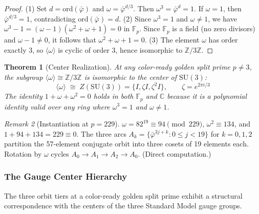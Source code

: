 \documentclass[12pt,oneside]{article}
\theoremstyle{principia}
\newtheorem{theorem}{Theorem}[section]
\theoremstyle{definition}
\theoremstyle{remark}
\newtheorem{remark}[theorem]{Remark}
\providecommand{\CC}{\mathbb{C}}
\providecommand{\ZZ}{\mathbb{Z}}
\providecommand{\FF}{\mathbb{F}}
\providecommand{\vpbar}{\bar{\varphi}}
\begin{document}
\begin{proof}
(1) Set $d = \mathrm{ord}(\vpbar)$ and $\omega = \vpbar^{d/3}$. Then $\omega^3 = \vpbar^d = 1$. If $\omega = 1$, then $\vpbar^{d/3} = 1$, contradicting $\mathrm{ord}(\vpbar) = d$. (2) Since $\omega^3 = 1$ and $\omega \neq 1$, we have $\omega^3 - 1 = (\omega - 1)(\omega^2 + \omega + 1) = 0$ in $\FF_p$. Since $\FF_p$ is a field (no zero divisors) and $\omega - 1 \neq 0$, it follows that $\omega^2 + \omega + 1 = 0$. (3) The element $\omega$ has order exactly 3, so $\langle\omega\rangle$ is cyclic of order 3, hence isomorphic to $\ZZ/3\ZZ$. \qedhere
\end{proof}

\begin{theorem}[Center Realization]\label{thm:center}
At any color-ready golden split prime $p \neq 3$, the subgroup $\langle\omega\rangle \cong \ZZ/3\ZZ$ is isomorphic to the center of $\mathrm{SU}(3)$:
$$\langle\omega\rangle \;\cong\; Z(\mathrm{SU}(3)) = \{I, \zeta I, \zeta^2 I\}, \qquad \zeta = e^{2\pi i/3}$$
The identity $1 + \omega + \omega^2 = 0$ holds in both $\FF_p$ and $\CC$ because it is a polynomial identity valid over any ring where $\omega^3 = 1$ and $\omega \neq 1$.
\end{theorem}

\begin{remark}[Instantiation at $p = 229$]
$\omega = 82^{19} \equiv 94 \pmod{229}$, $\omega^2 \equiv 134$, and $1 + 94 + 134 = 229 \equiv 0$. The three arcs $A_k = \{\vpbar^{3j+k} : 0 \leq j < 19\}$ for $k = 0, 1, 2$ partition the 57-element conjugate orbit into three cosets of 19 elements each. Rotation by $\omega$ cycles $A_0 \to A_1 \to A_2 \to A_0$. (Direct computation.)
\end{remark}

\subsubsection*{The Gauge Center Hierarchy}

The three orbit tiers at a color-ready golden split prime exhibit a structural correspondence with the centers of the three Standard Model gauge groups.
\end{document}
